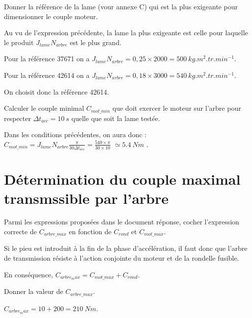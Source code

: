 \documentclass[11pt]{article}
\begin{document}
\UPSTIquestion Donner la référence de la lame (vour annexe C) qui est la plus exigeante pour dimensionner le couple moteur. 

\begin{UPSTIcorrige}
Au vu de l'expression précédente, la lame la plus exigeante est celle pour laquelle le produit 
$J_{lame} N_{arbre}$ est le plus grand. 

Pour la référence 37671 on a $J_{lame} N_{arbre} = 0,25 \times 2000 = \SI{500}{kg.m^2.tr.min^{-1}}$.

Pour la référence 42614 on a $J_{lame} N_{arbre} = 0,18 \times 3000 = \SI{540}{kg.m^2.tr.min^{-1}}$.

On choisit donc la référence 42614.
\end{UPSTIcorrige}


\UPSTIquestion Calculer le couple minimal $C_{mot\_min}$ que doit exercer le moteur sur l'arbre pour respecter $\Delta t _{acc}  = \SI{10}{s}$ quelle que soit la lame testée. 

\begin{UPSTIcorrige}
Dans les conditions précédentes, on aura donc 
:$  C_{mot\_min} = J_{lame} N_{arbre} \frac{\pi}{30 \Delta t_{acc}} =  \frac{540 \times \pi}{30 \times 10}$
$ \simeq \SI{5,4}{Nm}$ .

\end{UPSTIcorrige}


\section{Détermination du couple maximal transmssible par l'arbre}

\UPSTIquestion* Parmi les expressions proposées dans le document réponse, cocher l'expression correcte de $C_{arbre\_max}$ en fonction de $C_{rond}$ et $C_{mot\_max}$.
\begin{UPSTIcorrige}
Si le pieu est introduit à la fin de la phase d'accélération, il faut donc que l'arbre de transmission résiste à l'action conjointe du moteur et de la rondelle fusible. 

En conséquence, $C_{arbre_max} = C_{mot\_max}+ C_{rond}$.
\end{UPSTIcorrige}

\UPSTIquestion Donner la valeur de $C_{arbre\_max}$.

\begin{UPSTIcorrige}
$C_{arbre_max} = 10+ 200 = \SI{210}{Nm}$.
\end{UPSTIcorrige}


\end{document}
